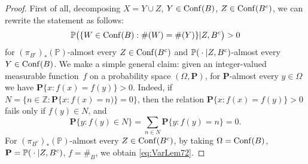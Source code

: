 \documentclass[12pt]{paper}
\numberwithin{theorem}{section}
\numberwithin{figure}{section}
\numberwithin{equation}{section}
\begin{document}
\begin{proof}

First of all, decomposing $X=Y\cup Z$, $Y\in\mathrm{Conf}(B)$, $Z\in\mathrm{Conf}(B^c)$, we can rewrite the statement as follows:
\begin{equation}\label{eq:VarLem72}
\mathbb{P}\bigl(\{W\in \mathrm{Conf}(B): \#(W)=\#(Y)\}|Z,B^c\bigr)>0
\end{equation}
for $(\pi_{B^c})_*(\mathbb P)$-almost every $Z\in\mathrm{Conf}(B^c)$ and $\mathbb{P}({}\cdot{}|Z, B^c)$-almost every $Y\in\mathrm{Conf}(B)$.
We make a simple general claim: given an integer-valued measurable function~$f$ on a probability space $(\Omega, \mathbf P)$, for $\mathbf P$-almost every $y\in\Omega$ we have ${\mathbf P}\{x:f(x)=f(y)\}>0$.
Indeed, if $N=\{n\in\mathbb Z: \mathbf P\{x:f(x)=n)\}=0\}$, then the relation $\mathbf P\{x:f(x)=f(y)\}>0$ fails only if $f(y)\in N$, and
$$
\mathbf P\{y:f(y)\in N\}=\sum_{n\in N}\mathbf P\{y:f(y)=n\}=0.
$$
For $(\pi_{B^c})_*(\mathbb P)$-almost every $Z\in\mathrm{Conf}(B^c)$,  by taking $\Omega=\mathrm{Conf}(B)$, $\mathbf P=\mathbb{P}({}\cdot{}|Z,B^c)$, $f=\#_B$, we obtain \eqref{eq:VarLem72}.
\end{proof}
\end{document}
